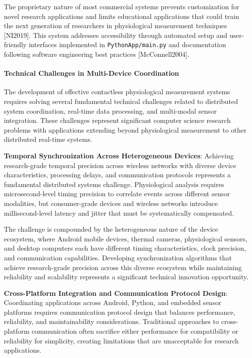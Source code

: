 \documentclass[11pt,a4paper]{article}
\begin{document}
The proprietary nature of most commercial systems prevents customization for novel
research applications and limits
educational applications that could train the next generation of researchers in
physiological measurement
techniques [NI2019].  This system addresses accessibility through automated setup and
user-friendly interfaces
implemented in \texttt{PythonApp/main.py} and documentation following
software engineering best
practices [McConnell2004].

\paragraph{Technical Challenges in Multi-Device Coordination}

The development of effective contactless physiological measurement systems requires
solving several fundamental
technical challenges related to distributed system coordination, real-time data
processing, and multi-modal sensor
integration.  These challenges represent significant computer science research
problems with applications extending
beyond physiological measurement to other distributed real-time systems.

\textbf{Temporal Synchronization Across Heterogeneous Devices}: Achieving research-grade temporal precision across wireless
networks with diverse device characteristics, processing delays, and communication
protocols represents a fundamental
distributed systems challenge.  Physiological analysis requires microsecond-level
timing precision to correlate events
across different sensor modalities, but consumer-grade devices and wireless networks
introduce millisecond-level latency
and jitter that must be systematically compensated.

The challenge is compounded by the heterogeneous nature of the device ecosystem,
where Android mobile devices, thermal
cameras, physiological sensors, and desktop computers each have different timing
characteristics, clock precision, and
communication capabilities.  Developing synchronization algorithms that achieve
research-grade precision across this
diverse ecosystem while maintaining reliability and scalability represents a
significant technical innovation
opportunity.

\textbf{Cross-Platform Integration and Communication Protocol Design}: Coordinating applications across Android, Python, and
embedded sensor platforms requires communication protocol design that
balances performance, reliability,
and maintainability considerations.  Traditional approaches to cross-platform
communication often sacrifice either
performance for compatibility or reliability for simplicity, creating limitations
that are unacceptable for research
applications.
\end{document}
